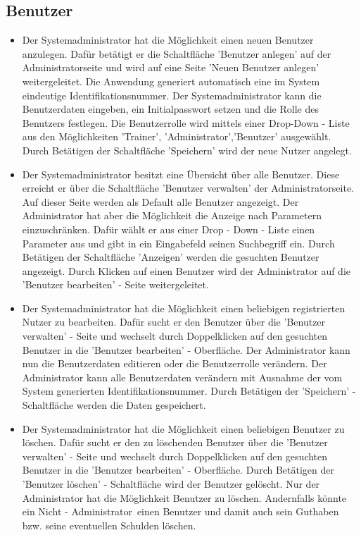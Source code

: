 \documentclass[a4paper]{scrreprt}
\begin{document}
\subsection{Benutzer}
\begin{itemize}
	\item {}
	Der Systemadministrator hat die Möglichkeit einen neuen Benutzer anzulegen. Dafür betätigt er die Schaltfläche 'Benutzer anlegen' auf der Administratorseite und wird auf eine Seite 'Neuen Benutzer anlegen' weitergeleitet. 
	Die Anwendung generiert automatisch eine im System eindeutige Identifikationsnummer. Der Systemadministrator kann die Benutzerdaten eingeben, ein Initialpasswort setzen und die Rolle des Benutzers festlegen. Die Benutzerrolle wird mittels einer Drop-Down - Liste aus den Möglichkeiten 'Trainer', 'Administrator','Benutzer' ausgewählt. Durch Betätigen der Schaltfläche 'Speichern' wird der neue Nutzer angelegt.
	\item {}
	Der Systemadministrator besitzt eine Übersicht über alle Benutzer. Diese erreicht er über die Schaltfläche 'Benutzer verwalten' der Administratorseite. Auf dieser Seite werden als Default alle Benutzer angezeigt. Der Administrator hat aber die Möglichkeit die Anzeige nach Parametern einzuschränken. Dafür wählt er aus einer Drop - Down - Liste einen Parameter aus und gibt in ein Eingabefeld seinen Suchbegriff ein. Durch Betätigen der Schaltfläche 'Anzeigen' werden die gesuchten Benutzer angezeigt. Durch Klicken auf einen Benutzer wird der Administrator auf die 'Benutzer bearbeiten' - Seite weitergeleitet.
	\item {}
	Der Systemadministrator hat die Möglichkeit einen beliebigen registrierten Nutzer zu bearbeiten. Dafür sucht er den Benutzer über die 'Benutzer verwalten' - Seite und wechselt durch Doppelklicken auf den gesuchten Benutzer in die 'Benutzer bearbeiten' - Oberfläche. Der Administrator kann nun die Benutzerdaten editieren oder die Benutzerrolle verändern. Der Administrator kann alle Benutzerdaten verändern mit Ausnahme der vom System generierten Identifikationsnummer. Durch Betätigen der 'Speichern' - Schaltfläche werden die Daten gespeichert.
	\item {}
	Der Systemadministrator hat die Möglichkeit einen beliebigen Benutzer zu löschen. Dafür sucht er den zu löschenden Benutzer über die 'Benutzer verwalten' - Seite und wechselt durch Doppelklicken auf den gesuchten Benutzer in die 'Benutzer bearbeiten' - Oberfläche. Durch Betätigen der 'Benutzer löschen' - Schaltfläche wird der Benutzer gelöscht. Nur der Administrator hat die Möglichkeit Benutzer zu löschen. Andernfalls könnte ein \glqq Nicht - Administrator\grqq \ einen Benutzer und damit auch sein Guthaben bzw. seine eventuellen Schulden löschen.

\end{itemize}
\end{document}
